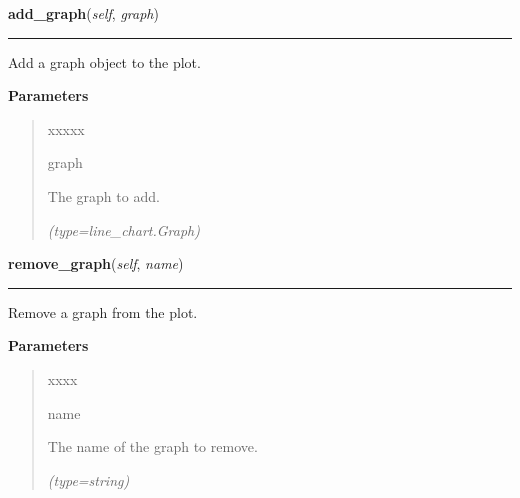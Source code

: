 \hspace{.8\funcindent}\begin{boxedminipage}{\funcwidth}

    \raggedright \textbf{add\_graph}(\textit{self}, \textit{graph})

    \vspace{-1.5ex}

    \rule{\textwidth}{0.5\fboxrule}
\setlength{\parskip}{2ex}
    Add a graph object to the plot.

\setlength{\parskip}{1ex}
      \textbf{Parameters}
      \vspace{-1ex}

      \begin{quote}
        \begin{Ventry}{xxxxx}

          \item[graph]

          The graph to add.

            {\it (type=line\_chart.Graph)}

        \end{Ventry}

      \end{quote}

    \end{boxedminipage}

    \label{pygtk_chart:line_chart:LineChart:remove_graph}

    \vspace{0.5ex}

\hspace{.8\funcindent}\begin{boxedminipage}{\funcwidth}

    \raggedright \textbf{remove\_graph}(\textit{self}, \textit{name})

    \vspace{-1.5ex}

    \rule{\textwidth}{0.5\fboxrule}
\setlength{\parskip}{2ex}
    Remove a graph from the plot.

\setlength{\parskip}{1ex}
      \textbf{Parameters}
      \vspace{-1ex}

      \begin{quote}
        \begin{Ventry}{xxxx}

          \item[name]

          The name of the graph to remove.

            {\it (type=string)}

        \end{Ventry}

      \end{quote}

    \end{boxedminipage}

